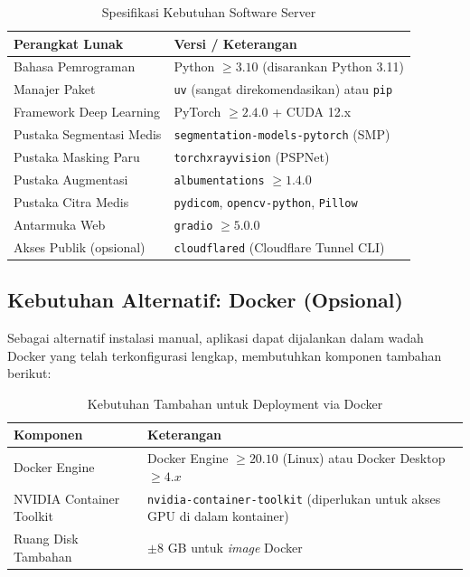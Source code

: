 \documentclass[12pt,a4paper]{article}
\begin{document}
\begin{table}[H]
\centering
\caption{Spesifikasi Kebutuhan Software Server}
\begin{tabularx}{\textwidth}{l X}
\toprule
\textbf{Perangkat Lunak}     & \textbf{Versi / Keterangan} \\
\midrule
Bahasa Pemrograman           & Python $\ge 3.10$ (disarankan Python 3.11) \\
Manajer Paket                & \texttt{uv} (sangat direkomendasikan) atau \texttt{pip} \\
Framework Deep Learning      & PyTorch $\ge 2.4.0$ + CUDA 12.x \\
Pustaka Segmentasi Medis     & \texttt{segmentation-models-pytorch} (SMP) \\
Pustaka Masking Paru         & \texttt{torchxrayvision} (PSPNet) \\
Pustaka Augmentasi           & \texttt{albumentations} $\ge 1.4.0$ \\
Pustaka Citra Medis          & \texttt{pydicom}, \texttt{opencv-python}, \texttt{Pillow} \\
Antarmuka Web                & \texttt{gradio} $\ge 5.0.0$ \\
Akses Publik (opsional)      & \texttt{cloudflared} (Cloudflare Tunnel CLI) \\
\bottomrule
\end{tabularx}
\end{table}

\subsection{Kebutuhan Alternatif: Docker (Opsional)}

Sebagai alternatif instalasi manual, aplikasi dapat dijalankan dalam wadah
Docker yang telah terkonfigurasi lengkap, membutuhkan komponen tambahan berikut:

\begin{table}[H]
\centering
\caption{Kebutuhan Tambahan untuk Deployment via Docker}
\begin{tabularx}{\textwidth}{l X}
\toprule
\textbf{Komponen} & \textbf{Keterangan} \\
\midrule
Docker Engine          & Docker Engine $\ge 20.10$ (Linux) atau Docker Desktop $\ge 4.x$ \\
NVIDIA Container Toolkit & \texttt{nvidia-container-toolkit} (diperlukan untuk akses GPU di dalam kontainer) \\
Ruang Disk Tambahan    & $\pm$8 GB untuk \textit{image} Docker \\
\bottomrule
\end{tabularx}
\end{table}
\end{document}
